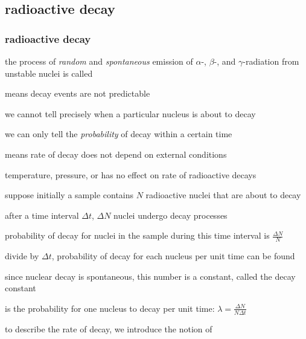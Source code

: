 \subsection{radioactive decay}

\subsubsection{radioactive decay}

\rcyskip

\begin{ilight}
	the process of \emph{random} and \emph{spontaneous} emission of $\alpha$-, $\beta$-, and $\gamma$-radiation from unstable nuclei is called 
\end{ilight}

\cmt {} means decay events are not predictable

we cannot tell precisely when a particular nucleus is about to decay

we can only tell the \emph{probability} of decay within a certain time

\cmt {} means rate of decay does not depend on external conditions

temperature, pressure, or has no effect on rate of radioactive decays

\vspace*{\baselineskip}

suppose initially a sample contains $N$ radioactive nuclei that are about to decay

after a time interval $\Delta t$, $\Delta N$ nuclei undergo decay processes

probability of decay for nuclei in the sample during this time interval is $\frac{\Delta N}{N}$

divide by $\Delta t$, probability of decay for each nucleus per unit time can be found

since nuclear decay is spontaneous, this number is a constant, called the decay constant

\begin{ilight}
	 is the probability for one nucleus to decay per unit time: $\boxed{\lambda = \frac{\Delta N}{N\Delta t}}$
\end{ilight}

\cmt to describe the rate of decay, we introduce the notion of 

